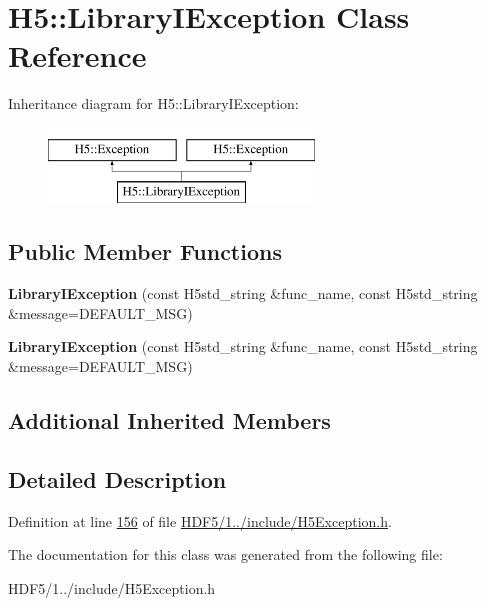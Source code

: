 \hypertarget{class_h5_1_1_library_i_exception}{}\section{H5\+:\+:Library\+I\+Exception Class Reference}
\label{class_h5_1_1_library_i_exception}
Inheritance diagram for H5\+:\+:Library\+I\+Exception\+:\begin{figure}[H]
\begin{center}
\leavevmode
\includegraphics[height=2.000000cm]{class_h5_1_1_library_i_exception}
\end{center}
\end{figure}
\subsection*{Public Member Functions}
\begin{DoxyCompactItemize}
\item 
\mbox{\label{class_h5_1_1_library_i_exception_ab1034ba68928fc4476a18723bfd4f8b5}} 
{\bfseries Library\+I\+Exception} (const H5std\+\_\+string \&func\+\_\+name, const H5std\+\_\+string \&message=D\+E\+F\+A\+U\+L\+T\+\_\+\+M\+SG)
\item 
\mbox{\label{class_h5_1_1_library_i_exception_ab1034ba68928fc4476a18723bfd4f8b5}} 
{\bfseries Library\+I\+Exception} (const H5std\+\_\+string \&func\+\_\+name, const H5std\+\_\+string \&message=D\+E\+F\+A\+U\+L\+T\+\_\+\+M\+SG)
\end{DoxyCompactItemize}
\subsection*{Additional Inherited Members}


\subsection{Detailed Description}


Definition at line \hyperlink{_h_d_f5_21_810_81_2include_2_h5_exception_8h_source_l00156}{156} of file \hyperlink{_h_d_f5_21_810_81_2include_2_h5_exception_8h_source}{H\+D\+F5/1../include/\+H5\+Exception.\+h}.



The documentation for this class was generated from the following file\+:\begin{DoxyCompactItemize}
\item 
H\+D\+F5/1../include/\+H5\+Exception.\+h\end{DoxyCompactItemize}
